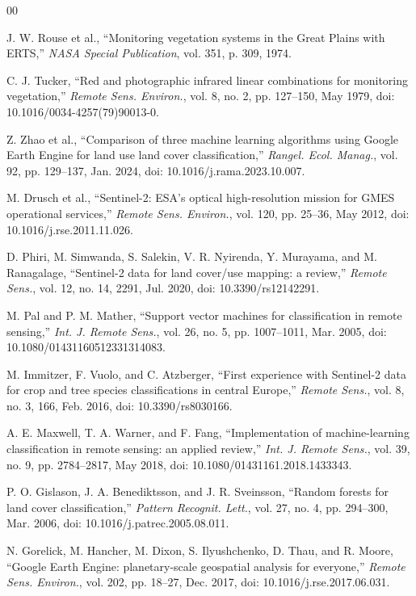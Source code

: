 \documentclass[conference]{IEEEtran}
\begin{document}
\begin{thebibliography}{00}

 J. W. Rouse et al., ``Monitoring vegetation systems in
the Great Plains with ERTS,'' \emph{NASA Special Publication}, vol. 351,
p. 309, 1974.

 C. J. Tucker, ``Red and photographic infrared linear
combinations for monitoring vegetation,'' \emph{Remote Sens. Environ.},
vol. 8, no. 2, pp. 127--150, May 1979, doi:
10.1016/0034-4257(79)90013-0.

 Z. Zhao et al., ``Comparison of three machine learning
algorithms using Google Earth Engine for land use land cover
classification,'' \emph{Rangel. Ecol. Manag.}, vol. 92, pp. 129--137,
Jan. 2024, doi: 10.1016/j.rama.2023.10.007.

 M. Drusch et al., ``Sentinel-2: ESA's optical
high-resolution mission for GMES operational services,'' \emph{Remote
Sens. Environ.}, vol. 120, pp. 25--36, May 2012, doi:
10.1016/j.rse.2011.11.026.

 D. Phiri, M. Simwanda, S. Salekin, V. R. Nyirenda,
Y. Murayama, and M. Ranagalage, ``Sentinel-2 data for land cover/use
mapping: a review,'' \emph{Remote Sens.}, vol. 12, no. 14, 2291, Jul.
2020, doi: 10.3390/rs12142291.

 M. Pal and P. M. Mather, ``Support vector machines for
classification in remote sensing,'' \emph{Int. J. Remote Sens.}, vol.
26, no. 5, pp. 1007--1011, Mar. 2005, doi:
10.1080/01431160512331314083.

 M. Immitzer, F. Vuolo, and C. Atzberger, ``First
experience with Sentinel-2 data for crop and tree species
classifications in central Europe,'' \emph{Remote Sens.}, vol. 8, no. 3,
166, Feb. 2016, doi: 10.3390/rs8030166.

 A. E. Maxwell, T. A. Warner, and F. Fang,
``Implementation of machine-learning classification in remote sensing:
an applied review,'' \emph{Int. J. Remote Sens.}, vol. 39, no. 9, pp.
2784--2817, May 2018, doi: 10.1080/01431161.2018.1433343.

 P. O. Gislason, J. A. Benediktsson, and J. R.
Sveinsson, ``Random forests for land cover classification,''
\emph{Pattern Recognit. Lett.}, vol. 27, no. 4, pp. 294--300, Mar. 2006,
doi: 10.1016/j.patrec.2005.08.011.

 N. Gorelick, M. Hancher, M. Dixon, S. Ilyushchenko,
D. Thau, and R. Moore, ``Google Earth Engine: planetary-scale geospatial
analysis for everyone,'' \emph{Remote Sens. Environ.}, vol. 202, pp.
18--27, Dec. 2017, doi: 10.1016/j.rse.2017.06.031.


\end{thebibliography}
\end{document}
